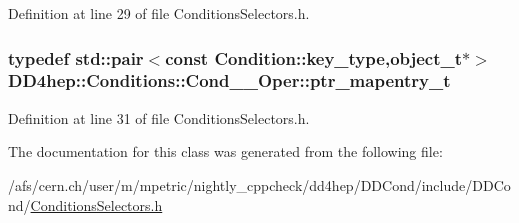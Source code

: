 Definition at line 29 of file ConditionsSelectors.h.\hypertarget{class_d_d4hep_1_1_conditions_1_1_cond_____oper_a0949e4bd5f90cd3fae2394cf30983973}{
\subsubsection[{ptr\_\-mapentry\_\-t}]{\setlength{\rightskip}{0pt plus 5cm}typedef std::pair$<$const {\bf Condition::key\_\-type},{\bf object\_\-t}$\ast$$>$ {\bf DD4hep::Conditions::Cond\_\-\_\-Oper::ptr\_\-mapentry\_\-t}}}
\label{class_d_d4hep_1_1_conditions_1_1_cond_____oper_a0949e4bd5f90cd3fae2394cf30983973}


Definition at line 31 of file ConditionsSelectors.h.

The documentation for this class was generated from the following file:\begin{DoxyCompactItemize}
\item 
/afs/cern.ch/user/m/mpetric/nightly\_\-cppcheck/dd4hep/DDCond/include/DDCond/\hyperlink{_conditions_selectors_8h}{ConditionsSelectors.h}\end{DoxyCompactItemize}

